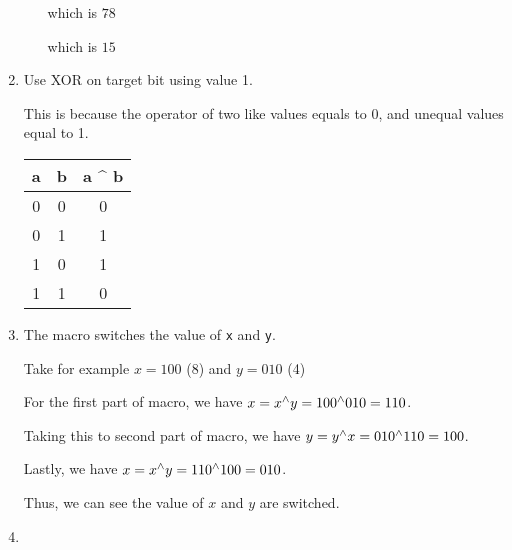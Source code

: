 \documentclass[12pt]{article}
\begin{document}
\begin{enumerate}[1.]
\begin{itemize}
        which is $7 \hat{} 8$

        \bigskip

        which is $15$

    \end{itemize}

    \item

    Use XOR on target bit using value 1.

    \bigskip

    This is because the operator of two like values equals to 0, and
    unequal values equal to 1.

    \bigskip

    \begin{center}
        \begin{tabular}{|c|c|c|}
            \hline
            a & b & a \^{} b\\
            \hline
            0 & 0  & 0 \\
            0 & 1  & 1 \\
            1 & 0  & 1 \\
            1 & 1  & 0 \\
            \hline
        \end{tabular}
    \end{center}

    \item

    The macro switches the value of \texttt{x} and \texttt{y}.

    \bigskip

    Take for example $x = 100$ (8) and $y = 010$ (4)

    \bigskip

    For the first part of macro, we have $x = x \textsuperscript{$\wedge$} y = 100 \textsuperscript{$\wedge$} 010 = 110$.

    \bigskip

    Taking this to second part of macro, we have $y = y \textsuperscript{$\wedge$} x = 010 \textsuperscript{$\wedge$} 110 = 100$.

    \bigskip

    Lastly, we have $x = x \textsuperscript{$\wedge$} y = 110 \textsuperscript{$\wedge$} 100 = 010$.

    \bigskip

    Thus, we can see the value of $x$ and $y$ are switched.

    \item


\end{enumerate}
\end{document}
